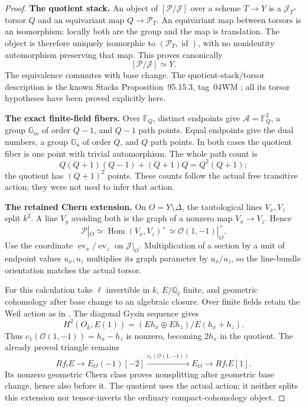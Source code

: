 \begin{proof}
\par\smallskip\noindent\textbf{The quotient stack.}\quad
An object of \([\mathcal P/\mathcal J]\) over a
scheme \(T\to Y\) is a \(\mathcal J_T\)-torsor \(Q\)
and an equivariant map \(Q\to\mathcal P_T\).
An equivariant map between torsors is an isomorphism:
locally both are the group and the map is translation.
The object is therefore uniquely isomorphic to
\((\mathcal P_T,\operatorname{id})\), with no
nonidentity automorphism preserving that map.
This proves canonically
\begin{equation}\label{eq:variableQuotientIsBase}
                          [\mathcal P/\mathcal J]\simeq Y.
\end{equation}
The equivalence commutes with base change.
The quotient-stack/torsor description is the known
Stacks Proposition~95.15.3, tag~04WM
\cite{StacksVariableQuotients}; all its torsor
hypotheses have been proved explicitly here.

\par\smallskip\noindent\textbf{The exact finite-field fibers.}\quad
Over \(\mathbb F_Q\), distinct endpoints give
\(\mathcal A=\mathbb F_Q^2\), a group
\(\mathbb G_m\) of order \(Q-1\), and \(Q-1\)
path points. Equal endpoints give the dual numbers,
a group \(\mathbb G_a\) of order \(Q\), and \(Q\)
path points. In both cases the quotient fiber is
one point with trivial automorphism.
The whole path count is
\[
 Q(Q+1)(Q-1)+(Q+1)Q=Q^2(Q+1);
\]
the quotient has \((Q+1)^2\) points.
These counts follow the actual free transitive action;
they were not used to infer that action.

\par\smallskip\noindent\textbf{The retained Chern extension.}\quad
On \(O=Y\setminus\Delta\), the tautological lines
\(V_x,V_z\) split \(k^2\).
A line \(V_y\) avoiding both is the graph of a
nonzero map \(V_x\to V_z\). Hence
\begin{equation}\label{eq:variableQuotientChernTorsor}
 \mathcal P|_O
       \simeq\operatorname{Hom}(V_x,V_z)^\times
       \simeq\mathcal O(1,-1)|_O^\times.
\end{equation}
Use the coordinate \(\operatorname{ev}_x/\operatorname{ev}_z\)
on \(\mathcal J|_O\).
Multiplication of a section by a unit of endpoint
values \(u_x,u_z\) multiplies its graph parameter by
\(u_x/u_z\), so the line-bundle orientation matches
the actual  torsor.

For this calculation take \(\ell\) invertible in \(k\),
\(E/\mathbb Q_\ell\) finite, and geometric cohomology
after base change to an algebraic closure.
Over finite fields retain the Weil action as in .
The diagonal Gysin sequence gives
\[
 H^2(O_{\bar k},E(1))
   =(Eh_x\oplus Eh_z)/E(h_x+h_z).
\]
Thus \(c_1(\mathcal O(1,-1))=h_x-h_z\) is
nonzero, becoming \(2h_x\) in the quotient.
The already proved  triangle remains
\[
 Rf_!E\longrightarrow E_O(-1)[-2]
  \xrightarrow{c_1(\mathcal O(1,-1))}E_O
  \longrightarrow Rf_!E[1].
\]
Its nonzero geometric Chern class proves nonsplitting
after geometric base change, hence also before it.
The quotient uses the actual action; it neither
splits this extension nor tensor-inverts the
ordinary compact-cohomology object.


\end{proof}
